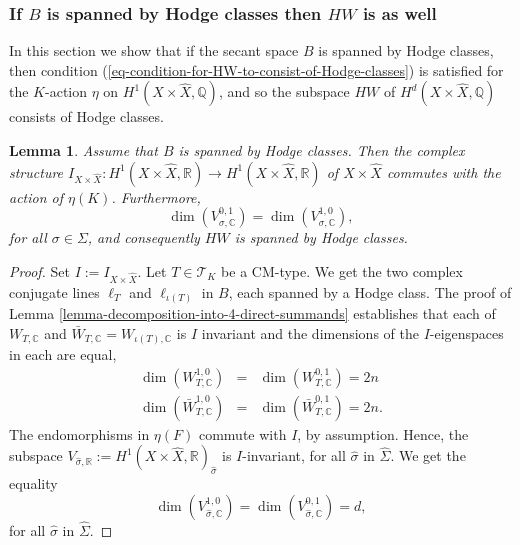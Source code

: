 \documentclass[12pt]{amsart}
\numberwithin{equation}{subsection}
\theoremstyle{plain}
\newtheorem{lem}[thm]{Lemma}
\theoremstyle{definition}
\newcommand{\CC}{{\mathbb C}}
\newcommand{\QQ}{{\mathbb Q}}
\newcommand{\RR}{{\mathbb R}}
\newcommand{\T}{{\mathcal T}}
\newcommand{\Spin}{{\rm Spin}}
\begin{document}
{%
%
\subsubsection{If $B$ is spanned by Hodge classes then $HW$ is as well}
In this section we show that if the secant space $B$ is spanned by Hodge classes, then condition 
(\ref{eq-condition-for-HW-to-consist-of-Hodge-classes}) is satisfied for the $K$-action $\eta$ on 
$H^1(X\times\hat{X},\QQ)$, and so the subspace $HW$ of $H^d(X\times\hat{X},\QQ)$ consists of Hodge classes.

\begin{lem}
Assume that $B$ is spanned by Hodge classes. Then the complex structure $I_{X\times\hat{X}}:H^1(X\times\hat{X},\RR)\rightarrow H^1(X\times\hat{X},\RR)$
of $X\times\hat{X}$ commutes with the action of $\eta(K)$. 
Furthermore, 
\begin{equation}
\label{eq-dim-V-sigma-0-1=dim-V-sigma-1-0}
\dim(V_{\sigma,\CC}^{0,1})=\dim(V_{\sigma,\CC}^{1,0}),
\end{equation}
for all $\sigma\in\Sigma$, and consequently $HW$ is spanned by Hodge classes.
\end{lem}

\begin{proof}
Set $I:=I_{X\times\hat{X}}$. Let $T\in\T_K$ be a CM-type. We get the two complex conjugate lines $\ell_T$ and $\ell_{\iota(T)}$ in $B$, each spanned by a Hodge class. 
The proof of Lemma \ref{lemma-decomposition-into-4-direct-summands} establishes that each of $W_{T,\CC}$ and $\bar{W}_{T,\CC}=W_{\iota(T),\CC}$ is $I$ invariant and the dimensions of the $I$-eigenspaces in each are equal,
\begin{eqnarray}
\label{eq-W-1-0=W-0-1}
\dim(W^{1,0}_{T,\CC})&=&\dim(W^{0,1}_{T,\CC})=2n
\\
\dim(\bar{W}^{1,0}_{T,\CC})&=&\dim(\bar{W}^{0,1}_{T,\CC})=2n.
\nonumber
\end{eqnarray} 
The endomorphisms in $\eta(F)$ commute with $I$, by assumption. Hence, the subspace $V_{\hat{\sigma},\RR}:=H^1(X\times\hat{X},\RR)_{\hat{\sigma}}$ is $I$-invariant, for all $\hat{\sigma}$ in $\hat{\Sigma}$. We get the equality
\begin{equation}
\label{eq-dim-V-hat-sigma-1-0-is-d}
\dim(V_{\hat{\sigma},\CC}^{1,0})=\dim(V_{\hat{\sigma},\CC}^{0,1})=d,
\end{equation}
for all $\hat{\sigma}$ in $\hat{\Sigma}$.


\end{proof}}
\end{document}
